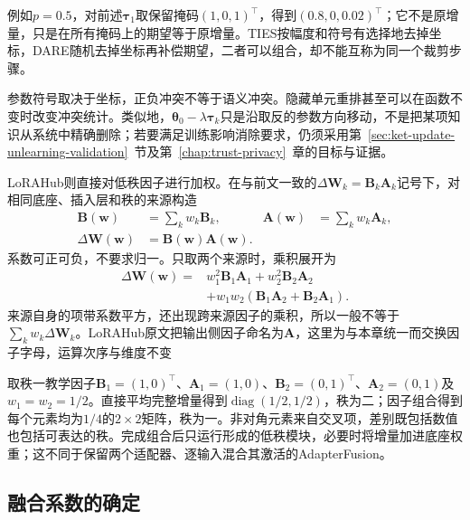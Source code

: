 例如$p=0.5$，对前述$\bm{\tau}_1$取保留掩码$(1,0,1)^\top$，得到$(0.8,0,0.02)^\top$；它不是原增量，只是在所有掩码上的期望等于原增量。TIES按幅度和符号有选择地去掉坐标，DARE随机去掉坐标再补偿期望，二者可以组合，却不能互称为同一个裁剪步骤。

参数符号取决于坐标，正负冲突不等于语义冲突。隐藏单元重排甚至可以在函数不变时改变冲突统计。类似地，$\bm{\theta}_0-\lambda\bm{\tau}_k$只是沿取反的参数方向移动，不是把某项知识从系统中精确删除；若要满足训练影响消除要求，仍须采用第~\ref{sec:ket-update-unlearning-validation}~节及第~\ref{chap:trust-privacy}~章的目标与证据。

LoRAHub则直接对低秩因子进行加权。在与前文一致的$\Delta\bm{W}_k=\bm{B}_k\bm{A}_k$记号下，对相同底座、插入层和秩的来源构造
\begin{equation}
  \begin{aligned}
    \bm{B}(\bm{w})&=\sum_k w_k\bm{B}_k,&
    \bm{A}(\bm{w})&=\sum_k w_k\bm{A}_k,\\
    \Delta\bm{W}(\bm{w})&=\bm{B}(\bm{w})\bm{A}(\bm{w}).
  \end{aligned}
  \label{eq:ket-integration-lorahub}
\end{equation}
系数可正可负，不要求归一。只取两个来源时，乘积展开为
\begin{equation}
  \begin{aligned}
    \Delta\bm{W}(\bm{w})
      ={}&w_1^2\bm{B}_1\bm{A}_1+w_2^2\bm{B}_2\bm{A}_2\\
       &+w_1w_2(\bm{B}_1\bm{A}_2+\bm{B}_2\bm{A}_1).
  \end{aligned}
  \label{eq:ket-integration-lorahub-cross-terms}
\end{equation}
来源自身的项带系数平方，还出现跨来源因子的乘积，所以一般不等于$\sum_k w_k\Delta\bm{W}_k$。LoRAHub原文把输出侧因子命名为$\bm{A}$，这里为与本章统一而交换因子字母，运算次序与维度不变

取秩一教学因子$\bm{B}_1=(1,0)^\top$、$\bm{A}_1=(1,0)$、$\bm{B}_2=(0,1)^\top$、$\bm{A}_2=(0,1)$及$w_1=w_2=1/2$。直接平均完整增量得到$\operatorname{diag}(1/2,1/2)$，秩为二；因子组合得到每个元素均为$1/4$的$2\times2$矩阵，秩为一。非对角元素来自交叉项，差别既包括数值也包括可表达的秩。完成组合后只运行形成的低秩模块，必要时将增量加进底座权重；这不同于保留两个适配器、逐输入混合其激活的AdapterFusion。

\subsection{融合系数的确定}
\label{sec:ket-integration-coefficients}

